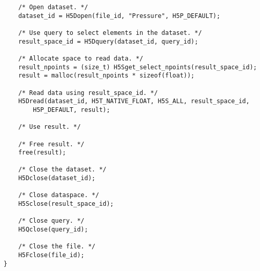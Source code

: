 {\begin{lstlisting}
    /* Open dataset. */
    dataset_id = H5Dopen(file_id, "Pressure", H5P_DEFAULT);

    /* Use query to select elements in the dataset. */
    result_space_id = H5Dquery(dataset_id, query_id);

    /* Allocate space to read data. */ 
    result_npoints = (size_t) H5Sget_select_npoints(result_space_id);
    result = malloc(result_npoints * sizeof(float));

    /* Read data using result_space_id. */
    H5Dread(dataset_id, H5T_NATIVE_FLOAT, H5S_ALL, result_space_id,
        H5P_DEFAULT, result);

    /* Use result. */

    /* Free result. */
    free(result);

    /* Close the dataset. */
    H5Dclose(dataset_id);

    /* Close dataspace. */
    H5Sclose(result_space_id);

    /* Close query. */
    H5Qclose(query_id);

    /* Close the file. */
    H5Fclose(file_id);
}
\end{lstlisting}
}


